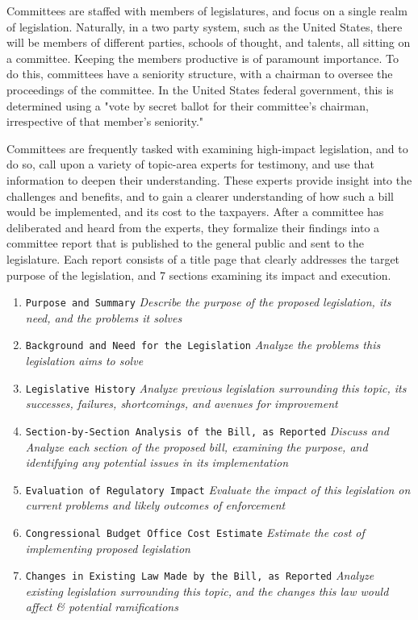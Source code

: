 \documentclass[letterpaper,twocolumn]{article}
\begin{document}
Committees are staffed with members of legislatures, and focus on a single realm of legislation.  Naturally, in a two party system, such as the United States, there will be members of different parties, schools of thought, and talents, all sitting on a committee. Keeping the members productive is of paramount importance.  To do this, committees have a seniority structure, with a chairman to oversee the proceedings of the committee.  In the United States federal government, this is determined using a "vote by secret ballot for their committee's chairman, irrespective of that member's seniority." \cite{Senate_Committees}

Committees are frequently tasked with examining high-impact legislation, and to do so, call upon a variety of topic-area experts for testimony, and use that information to deepen their understanding.  These experts provide insight into the challenges and benefits, and to gain a clearer understanding of how such a bill would be implemented, and its cost to the taxpayers.  After a committee has deliberated and heard from the experts, they formalize their findings into a committee report that is published to the general public and sent to the legislature.  Each report consists of a title page that clearly addresses the target purpose of the legislation, and 7 sections examining its impact and execution. \cite{Senate_Report}
\vspace{1cm}
\begin{enumerate}[I]
	\item \texttt{Purpose and Summary} \textbullet \small\textit{  Describe the purpose of the proposed legislation, its need, and the problems it solves}
	\item \texttt{Background and Need for the Legislation} \textbullet \textit{  Analyze the problems this legislation aims to solve}
	\item \texttt{Legislative History} \textbullet \small\textit{  Analyze previous legislation surrounding this topic, its successes, failures, shortcomings, and avenues for improvement}
	\item \texttt{Section-by-Section Analysis of the Bill, as Reported} \textbullet \small\textit{  Discuss and Analyze each section of the proposed bill, examining the purpose, and identifying any potential issues in its implementation}
	\item \texttt{Evaluation of Regulatory Impact} \textbullet \small\textit{  Evaluate the impact of this legislation on current problems and likely outcomes of enforcement}
	\item \texttt{Congressional Budget Office Cost Estimate} \textbullet \small\textit{  Estimate the cost of implementing proposed legislation}
	\item \texttt{Changes in Existing Law Made by the Bill, as Reported} \textbullet \small\textit{  Analyze existing legislation surrounding this topic, and the changes this law would affect \& potential ramifications}
	
	\label{fig:committee_report_outline}
\end{enumerate}
\end{document}
